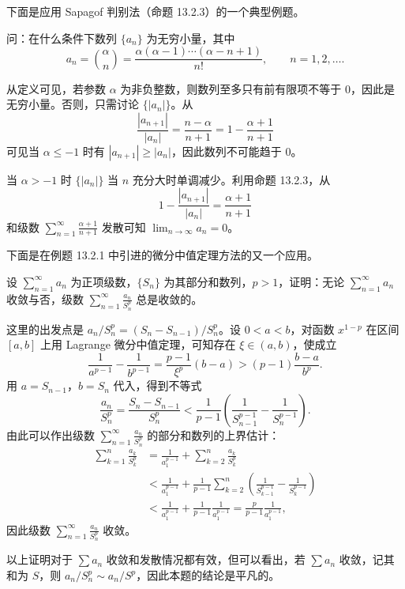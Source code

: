 下面是应用 Sapagof 判别法（命题 13.2.3）的一个典型例题。

\begin{xexample}[13.2.4]
问：在什么条件下数列 $\{a_n\}$ 为无穷小量，其中
\[
a_n=\binom{\alpha}{n}=\frac{\alpha(\alpha-1)\cdots(\alpha-n+1)}{n!},\qquad n=1,2,\ldots.
\]
\end{xexample}
\begin{xsolution}
从定义可见，若参数 $\alpha$ 为非负整数，则数列至多只有前有限项不等于 0，因此是无穷小量。否则，只需讨论 $\{|a_n|\}$。从
\[
\frac{|a_{n+1}|}{|a_n|}=\frac{n-\alpha}{n+1}=1-\frac{\alpha+1}{n+1}
\]
可见当 $\alpha\leq-1$ 时有 $|a_{n+1}|\geq|a_n|$，因此数列不可能趋于 0。

当 $\alpha>-1$ 时 $\{|a_n|\}$ 当 $n$ 充分大时单调减少。利用命题 13.2.3，从
\[
1-\frac{|a_{n+1}|}{|a_n|}=\frac{\alpha+1}{n+1}
\]
和级数 $\sum_{n=1}^{\infty}\frac{\alpha+1}{n+1}$ 发散可知 $\lim_{n\to\infty}a_n=0$。
\end{xsolution}

下面是在例题 13.2.1 中引进的微分中值定理方法的又一个应用。

\begin{xexample}[13.2.5]
设 $\sum_{n=1}^{\infty}a_n$ 为正项级数，$\{S_n\}$ 为其部分和数列，$p>1$，证明：无论 $\sum_{n=1}^{\infty}a_n$ 收敛与否，级数 $\sum_{n=1}^{\infty}\frac{a_n}{S_n^p}$ 总是收敛的。
\end{xexample}
\begin{xproof}
这里的出发点是 $a_n/S_n^p=(S_n-S_{n-1})/S_n^p$。设 $0<a<b$，对函数 $x^{1-p}$ 在区间 $[a,b]$ 上用 Lagrange 微分中值定理，可知存在 $\xi\in(a,b)$，使成立
\[
\frac1{a^{p-1}}-\frac1{b^{p-1}}=\frac{p-1}{\xi^p}(b-a)>(p-1)\frac{b-a}{b^p}.
\]
用 $a=S_{n-1}$，$b=S_n$ 代入，得到不等式
\[
\frac{a_n}{S_n^p}=\frac{S_n-S_{n-1}}{S_n^p}<\frac1{p-1}\left(\frac1{S_{n-1}^{p-1}}-\frac1{S_n^{p-1}}\right).
\]
由此可以作出级数 $\sum_{n=1}^{\infty}\frac{a_n}{S_n^p}$ 的部分和数列的上界估计：
\[
\begin{aligned}
\sum_{k=1}^{n}\frac{a_k}{S_k^p}
&=\frac1{a_1^{p-1}}+\sum_{k=2}^{n}\frac{a_k}{S_k^p}\\
&<\frac1{a_1^{p-1}}+\frac1{p-1}\sum_{k=2}^{n}\left(\frac1{S_{k-1}^{p-1}}-\frac1{S_k^{p-1}}\right)\\
&<\frac1{a_1^{p-1}}+\frac1{p-1}\frac1{a_1^{p-1}}
=\frac p{p-1}\frac1{a_1^{p-1}},
\end{aligned}
\]
因此级数 $\sum_{n=1}^{\infty}\frac{a_n}{S_n^p}$ 收敛。
\end{xproof}

\begin{xremark}
以上证明对于 $\sum a_n$ 收敛和发散情况都有效，但可以看出，若 $\sum a_n$ 收敛，记其和为 $S$，则 $a_n/S_n^p\sim a_n/S^p$，因此本题的结论是平凡的。
\end{xremark}

